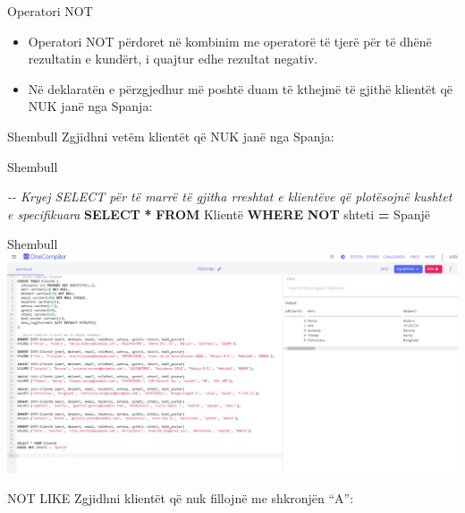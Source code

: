\documentclass[
  ignorenonframetext,
]{beamer}
\newenvironment{Shaded}{\begin{snugshade}}{\end{snugshade}}
\newcommand{\CommentTok}[1]{\textcolor[rgb]{0.56,0.35,0.01}{\textit{#1}}}
\newcommand{\KeywordTok}[1]{\textcolor[rgb]{0.13,0.29,0.53}{\textbf{#1}}}
\newcommand{\NormalTok}[1]{#1}
\newcommand{\OperatorTok}[1]{\textcolor[rgb]{0.81,0.36,0.00}{\textbf{#1}}}
\newcommand{\StringTok}[1]{\textcolor[rgb]{0.31,0.60,0.02}{#1}}
\begin{document}
\begin{frame}{Operatori NOT}
\label{operatori-not}
\begin{itemize}
\item
  Operatori NOT përdoret në kombinim me operatorë të tjerë për të dhënë
  rezultatin e kundërt, i quajtur edhe rezultat negativ.
\item
  Në deklaratën e përzgjedhur më poshtë duam të kthejmë të gjithë
  klientët që NUK janë nga Spanja:
\end{itemize}
\end{frame}

\begin{frame}{Shembull}
\label{shembull-43}
Zgjidhni vetëm klientët që NUK janë nga Spanja:
\end{frame}

\begin{frame}[fragile]{Shembull}
\label{shembull-44}

\begin{Shaded}
\begin{Highlighting}[]
\CommentTok{{-}{-} Kryej SELECT për të marrë të gjitha rreshtat e klientëve që plotësojnë kushtet e specifikuara}
\KeywordTok{SELECT} \OperatorTok{*} \KeywordTok{FROM}\NormalTok{ Klientë}
\KeywordTok{WHERE} \KeywordTok{NOT}\NormalTok{ shteti }\OperatorTok{=} \StringTok{\textquotesingle{}Spanjë\textquotesingle{}}
\end{Highlighting}
\end{Shaded}
\end{frame}

\begin{frame}{Shembull}
\label{shembull-45}
\includegraphics{./Figs/query22.png}
\end{frame}

\begin{frame}{NOT LIKE}
\label{not-like}
Zgjidhni klientët që nuk fillojnë me shkronjën ``A'':
\end{frame}
\end{document}

